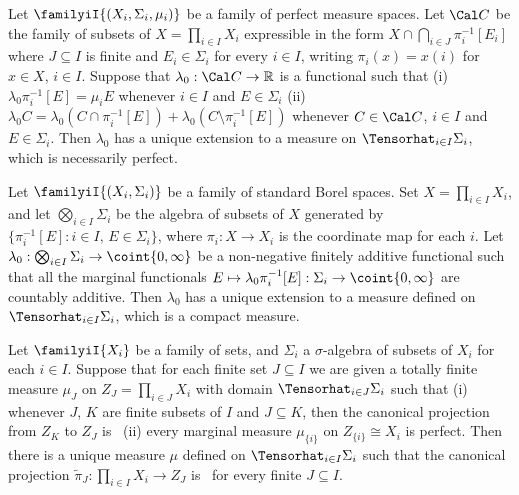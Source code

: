  Let $\familyiI{(X_i,\Sigma_i,\mu_i)}$ be a
family of perfect measure spaces.
Let $\Cal C$ be the family of subsets of $X=\prod_{i\in I}X_i$
expressible in the form $X\cap\bigcap_{i\in J}\pi_i^{-1}[E_i]$ where
$J\subseteq I$ is finite and $E_i\in\Sigma_i$ for every $i\in I$,
writing $\pi_i(x)=x(i)$ for $x\in X$, $i\in I$.   Suppose that
$\lambda_0:\Cal C\to\Bbb R$ is a functional such that (i)
$\lambda_0\pi_i^{-1}[E]=\mu_iE$ whenever $i\in I$ and $E\in\Sigma_i$
(ii) $\lambda_0C
=\lambda_0(C\cap\pi_i^{-1}[E])+\lambda_0(C\setminus\pi_i^{-1}[E])$
whenever $C\in\Cal C$, $i\in I$ and $E\in\Sigma_i$.   Then $\lambda_0$
has a unique extension to a measure on $\Tensorhat_{i\in I}\Sigma_i$,
which is necessarily perfect.


 Let $\familyiI{(X_i,\Sigma_i)}$ be a family of
standard Borel spaces.   Set $X=\prod_{i\in I}X_i$, and let
$\bigotimes_{i\in I}\Sigma_i$ be the algebra of subsets of $X$ generated
by $\{\pi_i^{-1}[E]:i\in I,\,E\in\Sigma_i\}$, where $\pi_i:X\to X_i$ is
the coordinate map for each $i$.   Let
$\lambda_0:\bigotimes_{i\in I}\Sigma_i\to\coint{0,\infty}$ be a
non-negative finitely
additive functional such that all the marginal functionals
$E\mapsto\lambda_0\pi_i^{-1}[E]:\Sigma_i\to\coint{0,\infty}$ are
countably additive.   Then $\lambda_0$ has a unique extension to a
measure defined on $\Tensorhat_{i\in I}\Sigma_i$, which is a compact
measure.


 Let $\familyiI{X_i}$ be a family of
sets, and
$\Sigma_i$ a $\sigma$-algebra of subsets of $X_i$ for each $i\in I$.
Suppose that for each finite set $J\subseteq I$ we are given a totally
finite measure $\mu_J$ on $Z_J=\prod_{i\in J}X_i$ with domain
$\Tensorhat_{i\in J}\Sigma_i$ such that (i) whenever $J$, $K$ are finite
subsets of $I$ and $J\subseteq K$, then the canonical projection from
$Z_K$ to $Z_J$ is \imp\ (ii) every marginal measure $\mu_{\{i\}}$ on
$Z_{\{i\}}\cong X_i$ is perfect.   Then there is a unique measure $\mu$
defined on $\Tensorhat_{i\in I}\Sigma_i$ such that the canonical
projection $\tilde\pi_J:\prod_{i\in I}X_i\to Z_J$ is \imp\ for every
finite $J\subseteq I$.


